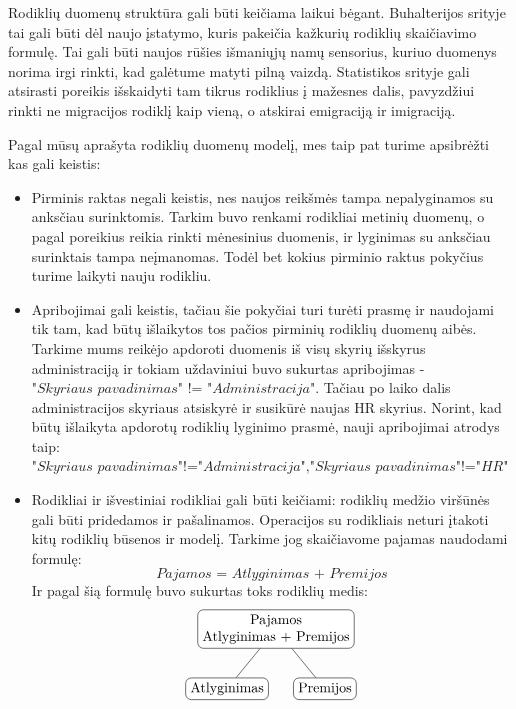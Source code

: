 \documentclass{VUMIFPSbakalaurinis}
\begin{document}
Rodiklių duomenų struktūra gali būti keičiama laikui bėgant. Buhalterijos srityje tai gali būti dėl naujo įstatymo, kuris pakeičia kažkurių rodiklių skaičiavimo formulę. Tai gali būti naujos rūšies išmaniųjų namų sensorius, kuriuo duomenys norima irgi rinkti, kad galėtume matyti pilną vaizdą. Statistikos srityje gali atsirasti poreikis išskaidyti tam tikrus rodiklius į mažesnes dalis, pavyzdžiui rinkti ne migracijos rodiklį kaip vieną, o atskirai emigraciją ir imigraciją. \par
Pagal mūsų aprašyta rodiklių duomenų modelį, mes taip pat turime apsibrėžti kas gali keistis:
\begin{itemize}
    \item Pirminis raktas negali keistis, nes naujos reikšmės tampa nepalyginamos su anksčiau surinktomis. Tarkim buvo renkami rodikliai metinių duomenų, o pagal poreikius reikia rinkti mėnesinius duomenis, ir lyginimas su anksčiau surinktais tampa neįmanomas. Todėl bet kokius pirminio raktus pokyčius turime laikyti nauju rodikliu. 
    \item Apribojimai gali keistis, tačiau šie pokyčiai turi turėti prasmę ir naudojami tik tam, kad būtų išlaikytos tos pačios pirminių rodiklių duomenų aibės. Tarkime mums reikėjo apdoroti duomenis iš visų skyrių išskyrus administraciją ir tokiam uždaviniui buvo sukurtas apribojimas - \(\textit{"Skyriaus pavadinimas" != "Administracija"}\). Tačiau po laiko dalis administracijos skyriaus atsiskyrė ir susikūrė naujas HR skyrius. Norint, kad būtų išlaikyta apdorotų rodiklių lyginimo prasmė, nauji apribojimai atrodys taip: \(\textit{"Skyriaus pavadinimas"!="Administracija"}, \textit{"Skyriaus pavadinimas"!="HR"}\)
    \item Rodikliai ir išvestiniai rodikliai gali būti keičiami: rodiklių medžio viršūnės gali būti pridedamos ir pašalinamos. Operacijos su rodikliais neturi įtakoti kitų rodiklių būsenos ir modelį. Tarkime jog skaičiavome pajamas naudodami formulę: \[\textit{Pajamos = Atlyginimas + Premijos}\] Ir pagal šią formulę buvo sukurtas toks rodiklių medis: 
    \[	
        \begin{tikzpicture}[sibling distance=7em,	
            every node/.style = {shape=rectangle, rounded corners,	
                                 draw, align=center,	
                                 top color=white, bottom color=white}]	
            \node {Pajamos\\Atlyginimas + Premijos}	
                    child { node {Atlyginimas} }	
                    child { node {Premijos} } ;	
        \end{tikzpicture} 	
\]
\end{itemize}
\end{document}
